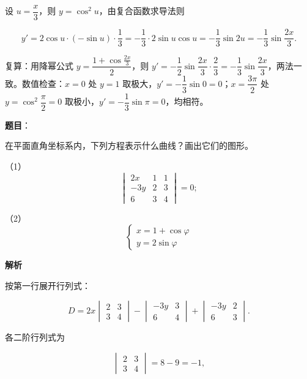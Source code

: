 \begin{answer}
设 $u=\dfrac x3$，则 $y=\cos^2u$，由复合函数求导法则

\nopagebreak[4]
\[
y'=2\cos u\cdot(-\sin u)\cdot\frac13
=-\frac13\cdot 2\sin u\cos u
=-\frac13\sin 2u
=-\frac13\sin\frac{2x}{3}.
\]

复算：用降幂公式 $y=\dfrac{1+\cos\frac{2x}{3}}{2}$，则 $y'=-\dfrac12\sin\dfrac{2x}{3}\cdot\dfrac23=-\dfrac13\sin\dfrac{2x}{3}$，两法一致。数值检查：$x=0$ 处 $y=1$ 取极大，$y'=-\dfrac13\sin0=0$；$x=\dfrac{3\pi}{2}$ 处 $y=\cos^2\dfrac\pi2=0$ 取极小，$y'=-\dfrac13\sin\pi=0$，均相符。



\end{answer}
\begin{answer}

\textbf{题目}：

在平面直角坐标系内，下列方程表示什么曲线？画出它们的图形。

（1） 
\nopagebreak[4]
\[
\begin{vmatrix}
2x & 1 & 1\\
-3y & 2 & 3\\
6 & 3 & 4
\end{vmatrix}=0;
\]

（2） 
\nopagebreak[4]
\[
\begin{cases}
x=1+\cos\varphi\\
y=2\sin\varphi
\end{cases}
\]

\textbf{解析}


按第一行展开行列式：

\nopagebreak[4]
\[
D=2x\begin{vmatrix}2&3\\3&4\end{vmatrix}
-\begin{vmatrix}-3y&3\\6&4\end{vmatrix}
+\begin{vmatrix}-3y&2\\6&3\end{vmatrix}.
\]

各二阶行列式为

\nopagebreak[4]
\[
\begin{vmatrix}2&3\\3&4\end{vmatrix}=8-9=-1,
\]


\end{answer}
